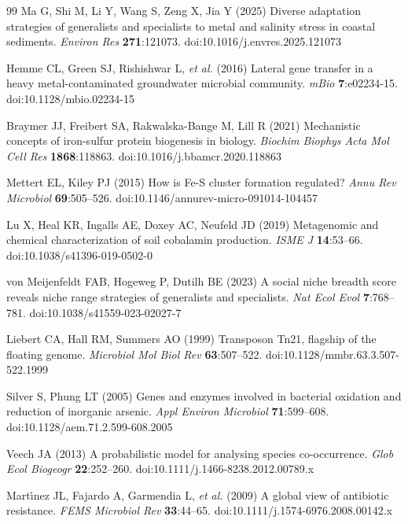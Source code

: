 \documentclass[times]{zHenriquesLab-StyleBioRxiv}
\begin{document}
\begin{thebibliography}{99}
Ma G, Shi M, Li Y, Wang S, Zeng X, Jia Y (2025) Diverse adaptation
strategies of generalists and specialists to metal and salinity stress in
coastal sediments. \textit{Environ Res} \textbf{271}:121073.
doi:10.1016/j.envres.2025.121073

Hemme CL, Green SJ, Rishishwar L, \textit{et al.} (2016) Lateral gene
transfer in a heavy metal-contaminated groundwater microbial community.
\textit{mBio} \textbf{7}:e02234-15. doi:10.1128/mbio.02234-15

Braymer JJ, Freibert SA, Rakwalska-Bange M, Lill R (2021) Mechanistic
concepts of iron-sulfur protein biogenesis in biology. \textit{Biochim
Biophys Acta Mol Cell Res} \textbf{1868}:118863.
doi:10.1016/j.bbamcr.2020.118863

Mettert EL, Kiley PJ (2015) How is Fe-S cluster formation regulated?
\textit{Annu Rev Microbiol} \textbf{69}:505--526.
doi:10.1146/annurev-micro-091014-104457

Lu X, Heal KR, Ingalls AE, Doxey AC, Neufeld JD (2019) Metagenomic
and chemical characterization of soil cobalamin production. \textit{ISME J}
\textbf{14}:53--66. doi:10.1038/s41396-019-0502-0

von Meijenfeldt FAB, Hogeweg P, Dutilh BE (2023) A social niche breadth
score reveals niche range strategies of generalists and specialists.
\textit{Nat Ecol Evol} \textbf{7}:768--781. doi:10.1038/s41559-023-02027-7

Liebert CA, Hall RM, Summers AO (1999) Transposon Tn21, flagship of the
floating genome. \textit{Microbiol Mol Biol Rev} \textbf{63}:507--522.
doi:10.1128/mmbr.63.3.507-522.1999

Silver S, Phung LT (2005) Genes and enzymes involved in bacterial oxidation
and reduction of inorganic arsenic. \textit{Appl Environ Microbiol}
\textbf{71}:599--608. doi:10.1128/aem.71.2.599-608.2005

Veech JA (2013) A probabilistic model for analysing species co-occurrence.
\textit{Glob Ecol Biogeogr} \textbf{22}:252--260.
doi:10.1111/j.1466-8238.2012.00789.x

Mart\'{\i}nez JL, Fajardo A, Garmendia L, \textit{et al.} (2009) A global
view of antibiotic resistance. \textit{FEMS Microbiol Rev} \textbf{33}:44--65.
doi:10.1111/j.1574-6976.2008.00142.x


\end{thebibliography}
\end{document}
